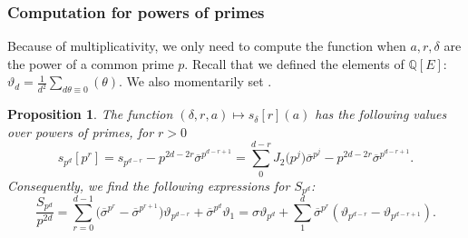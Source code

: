 \documentclass[11pt]{article}
\numberwithin{equation}{section}
\newcommand{\QQ}{\mathbb{Q}}
\numberwithin{equation}{section}
\newtheorem{prop}[theo]{Proposition}
\theoremstyle{definition}
\begin{document}
\subsubsection{Computation for powers of primes} Because of multiplicativity, we only need to compute the function when $a,r,\delta$ are the power of a common prime $p$. Recall that we defined the elements of $\QQ[E]$: $\vartheta_d=\frac{1}{d^2}\sum_{d\theta\equiv 0}(\theta)$. We also momentarily set .


\begin{prop}\label{prop-expression-powers-primes}
 The function $(\delta,r,a)\mapsto s_\delta[r](a)$ has the following values over powers of primes, for $r>0$
 \[ s_{p^d}[p^r]=s_{p^{d-r}}-p^{2d-2r}\overline{\sigma}^{p^{d-r+1}} = \sum_0^{d-r} J_2\bigl(p^j\bigr)\overline{\sigma}^{p^j} -p^{2d-2r}\overline{\sigma}^{p^{d-r+1}} . \]
 Consequently, we find the following expressions for $S_{p^d}$:
 \[ \frac{S_{p^d}}{p^{2d}} = \sum_{r=0}^{d-1} \bigl(\overline{\sigma}^{p^r}-\overline{\sigma}^{p^{r+1}}\bigr)\vartheta_{p^{d-r}} + \overline{\sigma}^{p^d}\vartheta_1
 = \sigma\vartheta_{p^d} + \sum_1^d \overline{\sigma}^{p^r} (\vartheta_{p^{d-r}}-\vartheta_{p^{d-r+1}}). \]

\end{prop}
\end{document}
